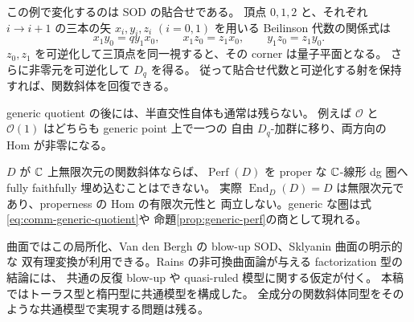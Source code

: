 この例で変化するのは SOD の貼合せである。
頂点 $0,1,2$ と、それぞれ $i\to i+1$ の三本の矢
$x_i,y_i,z_i$ $(i=0,1)$ を用いる Beilinson 代数の関係式は
\[
 x_1y_0=qy_1x_0,\qquad x_1z_0=z_1x_0,\qquad y_1z_0=z_1y_0.
\]
$z_0,z_1$ を可逆化して三頂点を同一視すると、その corner は量子平面となる。
さらに非零元を可逆化して $D_q$ を得る。
従って貼合せ代数と可逆化する射を保持すれば、関数斜体を回復できる。

generic quotient の後には、半直交性自体も通常は残らない。
例えば $\mathcal O$ と $\mathcal O(1)$ はどちらも generic point 上で一つの
自由 $D_q$-加群に移り、両方向の Hom が非零になる。

\begin{remark}\label{rem:generic-not-proper}
$D$ が $\mathbb C$ 上無限次元の関数斜体ならば、$\operatorname{Perf}(D)$ を
proper な $\mathbb C$-線形 dg 圏へ fully faithfully 埋め込むことはできない。
実際 $\operatorname{End}_D(D)=D$ は無限次元であり、properness の Hom の有限次元性と
両立しない。generic な圏は式\eqref{eq:comm-generic-quotient}や
命題\ref{prop:generic-perf}の商として現れる。
\end{remark}

曲面ではこの局所化、Van den Bergh の blow-up SOD、Sklyanin 曲面の明示的な
双有理変換が利用できる。Rains の非可換曲面論が与える factorization 型の結論には、
共通の反復 blow-up や quasi-ruled 模型に関する仮定が付く。
本稿ではトーラス型と楕円型に共通模型を構成した。
全成分の関数斜体同型をそのような共通模型で実現する問題は残る。
